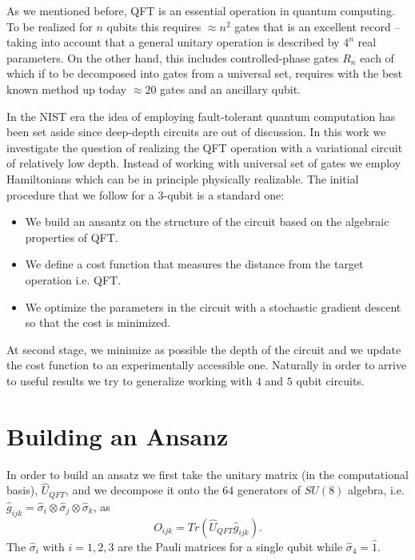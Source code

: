\documentclass[inscr,ack,preface]{diphdthesis}
\begin{document}
As we mentioned before, QFT is an essential operation in quantum computing. To be realized for $n$ qubits this requires 
$\approx n^2$ gates that is an excellent record --taking into account that a general unitary operation
is described by $4^n$ real parameters. On the other hand, this includes controlled-phase gates $R_n$
each of which if to be decomposed into gates from a universal set, requires with the best known
method up today $\approx 20$ gates and an ancillary qubit. 

In the NIST era the idea of employing fault-tolerant quantum computation has been set aside
since deep-depth circuits are out of discussion. In this work we investigate the question
of realizing the QFT operation with a variational circuit of relatively low depth. Instead of
working with universal set of gates we employ Hamiltonians which can be in principle physically realizable.
 The initial procedure that we follow for a $3$-qubit is a standard one:
\begin{itemize}
	\item We build an ansantz on the structure of the circuit based on the algebraic properties of QFT.
	\item We define a cost function that measures the distance from the target operation i.e. QFT.
	\item We optimize the parameters in the circuit with a stochastic gradient descent so that the cost is minimized. 
\end{itemize}
At second stage, we minimize as possible the depth of the circuit and we update the cost function to an experimentally accessible one.
Naturally in order to arrive to useful results we try to generalize working with $4$ and $5$ qubit circuits.
  
\section{Building an Ansanz} 

In order to build an ansatz we first take the unitary matrix (in the computational basis), $\hat{U}_{QFT}$,
and we decompose it onto the $64$ generators of $SU(8)$ algebra, i.e. $\hat{g}_{ijk}=\hat{\sigma}_{i} \otimes \hat{\sigma}_{j} \otimes \hat{\sigma}_{k}$,
as 
\begin{equation}
O_{ijk}=Tr\left(\hat{U}_{QFT} \hat{g}_{ijk} \right).
\end{equation}
The $\hat{\sigma}_{i}$ with $i=1,2,3$ are the Pauli matrices for a single qubit while $\hat{\sigma}_{4}=\hat{1}$.
\end{document}
